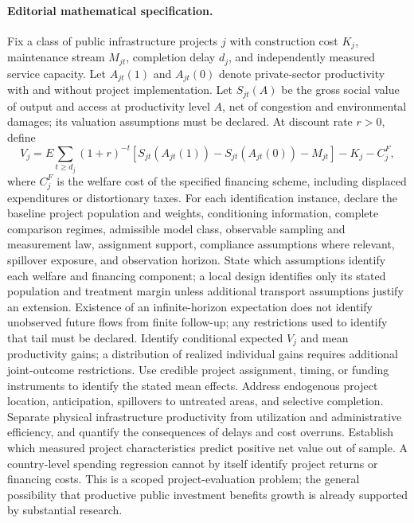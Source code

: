 \documentclass[11pt,a4paper]{article}
\begin{document}
\paragraph{Editorial mathematical specification.} Fix a class of public infrastructure projects \(j\) with construction cost \(K_j\), maintenance stream \(M_{jt}\), completion delay \(d_j\), and independently measured service capacity. Let \(A_{jt}(1)\) and \(A_{jt}(0)\) denote private-sector productivity with and without project implementation. Let \(S_{jt}(A)\) be the gross social value of output and access at productivity level \(A\), net of congestion and environmental damages; its valuation assumptions must be declared. At discount rate \(r>0\), define
\[
V_j=E\sum_{t\ge d_j}(1+r)^{-t}
[S_{jt}(A_{jt}(1))-S_{jt}(A_{jt}(0))-M_{jt}]
-K_j-C_j^F,
\]
where \(C_j^F\) is the welfare cost of the specified financing scheme, including displaced expenditures or distortionary taxes.
For each identification instance, declare the baseline project population and weights, conditioning information, complete comparison regimes, admissible model class, observable sampling and measurement law, assignment support, compliance assumptions where relevant, spillover exposure, and observation horizon. State which assumptions identify each welfare and financing component; a local design identifies only its stated population and treatment margin unless additional transport assumptions justify an extension. Existence of an infinite-horizon expectation does not identify unobserved future flows from finite follow-up; any restrictions used to identify that tail must be declared.
Identify conditional expected \(V_j\) and mean productivity gains; a distribution of realized individual gains requires additional joint-outcome restrictions. Use credible project assignment, timing, or funding instruments to identify the stated mean effects. Address endogenous project location, anticipation, spillovers to untreated areas, and selective completion. Separate physical infrastructure productivity from utilization and administrative efficiency, and quantify the consequences of delays and cost overruns. Establish which measured project characteristics predict positive net value out of sample. A country-level spending regression cannot by itself identify project returns or financing costs. This is a scoped project-evaluation problem; the general possibility that productive public investment benefits growth is already supported by substantial research.
\end{document}

